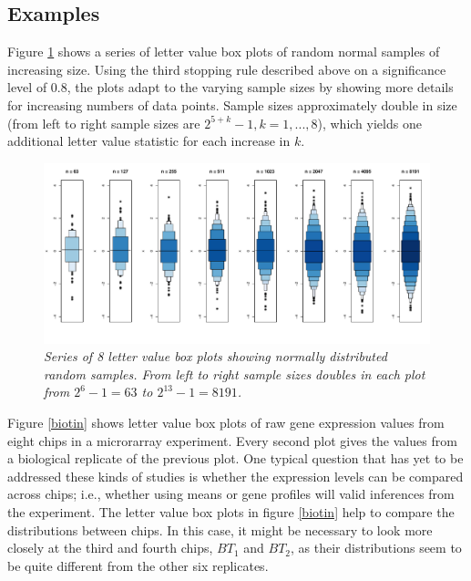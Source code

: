 \documentclass[11pt]{article}
\begin{document}
\subsection*{Examples}
Figure \ref{series} shows a series of letter value box plots of random normal samples of increasing size. Using the third stopping rule described above on a significance level of 0.8, the plots adapt to the varying sample sizes by showing more details for increasing numbers of data points. Sample sizes approximately double in size (from left to right sample sizes are $2^{5+k}-1, k = 1, ..., 8$), which yields one additional letter value statistic for each increase in $k$.
\begin{figure}[hbt]
\begin{center}
\includegraphics[width=6in]{boxplot-series.pdf}
\caption{\it \label{series} Series of 8 letter value box plots showing normally distributed random samples. From left to right sample sizes doubles in each plot from $2^6-1 = 63$ to $2^{13}-1=8191$.}
\end{center}
\end{figure}

Figure \ref{biotin} shows letter value box plots of raw gene 
expression values from eight chips in a  microrarray experiment. 
Every second plot gives the values from a biological replicate 
of the previous plot.  
One typical question that has yet to be addressed
these kinds of studies is whether the expression 
levels can be compared across chips; i.e., whether 
using means or gene profiles will valid inferences from the experiment.   
The letter value box plots in figure \ref{biotin} help to compare the 
distributions between chips. In this case, it might be necessary 
to look more closely at the third and fourth chips, 
$B T_1$ and $B T_2$, as their distributions seem to be 
quite different from the other six replicates.
\end{document}
